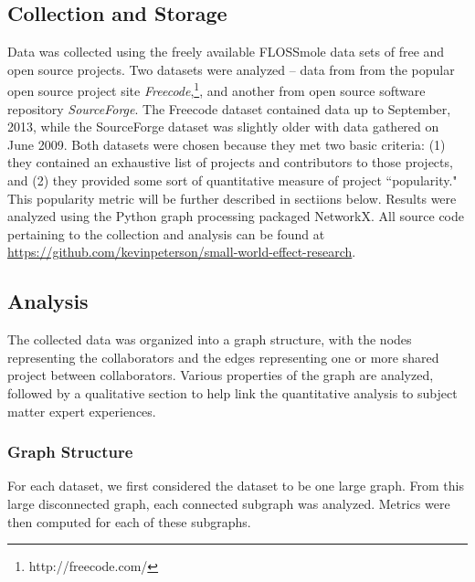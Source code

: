 \documentclass{proc}
\begin{document}
\subsection{Collection and Storage}
Data was collected using the freely available FLOSSmole\cite{floss2006} data sets of free and open source projects. Two datasets were analyzed -- data from from the popular open source project site \textit{Freecode},\footnote{http://freecode.com/}, and another from open source software repository \textit{SourceForge}. The Freecode dataset contained data up to September, 2013, while the SourceForge dataset was slightly older with data gathered on June 2009. Both datasets were chosen because they met two basic criteria: (1) they contained an exhaustive list of projects and contributors to those projects, and (2) they provided some sort of quantitative measure of project ``popularity." This popularity metric will be further described in sectiions below. Results were analyzed using the Python graph processing packaged NetworkX\cite{hagberg-2008-exploring}. All source code pertaining to the collection and analysis can be found at \url{https://github.com/kevinpeterson/small-world-effect-research}.

\subsection{Analysis}
The collected data was organized into a graph structure, with the nodes representing the collaborators and the edges representing one or more shared project between collaborators. Various properties of the graph are analyzed, followed by a qualitative section to help link the quantitative analysis to subject matter expert experiences.

\subsubsection{Graph Structure}
For each dataset, we first considered the dataset to be one large graph. From this large disconnected graph, each connected subgraph was analyzed. Metrics were then computed for each of these subgraphs.
\end{document}
